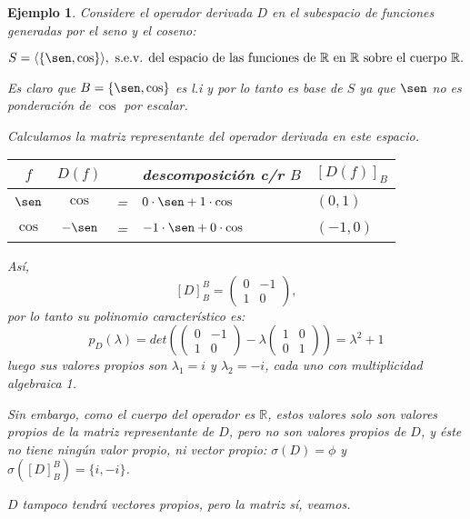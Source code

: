 \documentclass[12pt]{book}
\newtheorem{ejem}{Ejemplo}
\def\R{\mathbb{R}}
\begin{document}
\begin{ejem}
Considere el operador derivada $D$ en el subespacio de funciones generadas por el seno y el coseno:

$$S=\langle\{\sen,\cos\}\rangle, \textrm{ s.e.v. del espacio de las funciones de $\R$ en $\R$ sobre el cuerpo $\R$.}$$ 

Es claro que $B=\{\sen,\cos\}$ es l.i y por lo tanto es base de $S$ ya que $\sen$ no es ponderación de $\cos$ por escalar.

Calculamos la matriz representante del operador derivada en este espacio.

\begin{tabular}{c|ccl|l}
$f$&$D(f)$&&descomposición c/r $B$&$[D(f)]_{B}$\\\hline
$\sen$ & $\cos$ &=&$0\cdot\sen+1\cdot \cos$& $(0,1)$\\
$\cos$& $-\sen$&=&$-1\cdot\sen+0\cdot \cos$& $(-1,0)$\\
\end{tabular}

Así,
$$[D]_{B}^{B}=\left(\begin{matrix} 0&-1 \\ 1&0 \end{matrix}\right),$$
por lo tanto su polinomio característico es:
$$p_D(\lambda)=det\left(\left(\begin{matrix} 0&-1 \\ 1&0 \end{matrix}\right)-\lambda\left(\begin{matrix} 1 & 0 \\ 0 & 1   \end{matrix}\right)\right)=\lambda^2+1$$
luego sus valores propios son $\lambda_1=i$ y $\lambda_2=-i$, cada uno con multiplicidad algebraica 1.

Sin embargo, como el cuerpo del operador es $\R$, estos valores solo son valores propios de la matriz representante de $D$, pero no son valores propios de $D$, y éste no tiene ningún valor propio, ni vector propio: $\sigma(D)=\phi$ y $\sigma([D]_B^B)=\{i,-i\}$.

$D$ tampoco tendrá vectores propios, pero la matriz sí, veamos.


\end{ejem}
\end{document}
